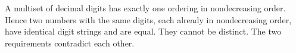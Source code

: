 A multiset of decimal digits has exactly one ordering in nondecreasing order. Hence two numbers with the same digits, each already in nondecreasing order, have identical digit strings and are equal. They cannot be distinct. The two requirements contradict each other.
